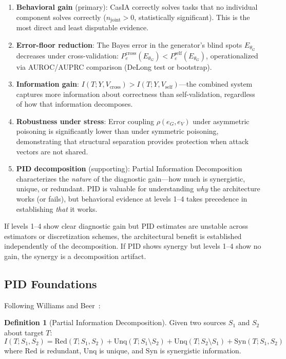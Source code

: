 \documentclass[11pt,a4paper]{article}
\theoremstyle{definition}
\newtheorem{definition}{Definition}[section]
\newcommand{\thetaG}{\theta_G}
\begin{document}
\begin{enumerate}[leftmargin=*,itemsep=3pt]
\item \textbf{Behavioral gain} (primary): CasIA correctly solves tasks that no individual component solves correctly ($n_\text{joint} > 0$, statistically significant). This is the most direct and least disputable evidence.
\item \textbf{Error-floor reduction}: The Bayes error in the generator's blind spots $E_{\thetaG}$ decreases under cross-validation: $P_e^\text{cross}(E_{\thetaG}) < P_e^\text{self}(E_{\thetaG})$, operationalized via AUROC/AUPRC comparison (DeLong test or bootstrap).
\item \textbf{Information gain}: $I(T; Y, V_\text{cross}) > I(T; Y, V_\text{self})$---the combined system captures more information about correctness than self-validation, regardless of how that information decomposes.
\item \textbf{Robustness under stress}: Error coupling $\rho(e_G, e_V)$ under asymmetric poisoning is significantly lower than under symmetric poisoning, demonstrating that structural separation provides protection when attack vectors are not shared.
\item \textbf{PID decomposition} (supporting): Partial Information Decomposition characterizes the \emph{nature} of the diagnostic gain---how much is synergistic, unique, or redundant. PID is valuable for understanding \emph{why} the architecture works (or fails), but behavioral evidence at levels 1--4 takes precedence in establishing \emph{that} it works.
\end{enumerate}

If levels 1--4 show clear diagnostic gain but PID estimates are unstable across estimators or discretization schemes, the architectural benefit is established independently of the decomposition. If PID shows synergy but levels 1--4 show no gain, the synergy is a decomposition artifact.

\subsection{PID Foundations}

Following Williams and Beer~\cite{williams2010pid}:

\begin{definition}[Partial Information Decomposition]
\label{def:pid}
Given two sources $S_1$ and $S_2$ about target $T$:
\begin{equation}
I(T; S_1, S_2) = \mathrm{Red}(T; S_1, S_2) + \mathrm{Unq}(T; S_1 \setminus S_2) + \mathrm{Unq}(T; S_2 \setminus S_1) + \mathrm{Syn}(T; S_1, S_2)
\end{equation}
where $\mathrm{Red}$ is redundant, $\mathrm{Unq}$ is unique, and $\mathrm{Syn}$ is synergistic information.
\end{definition}
\end{document}
